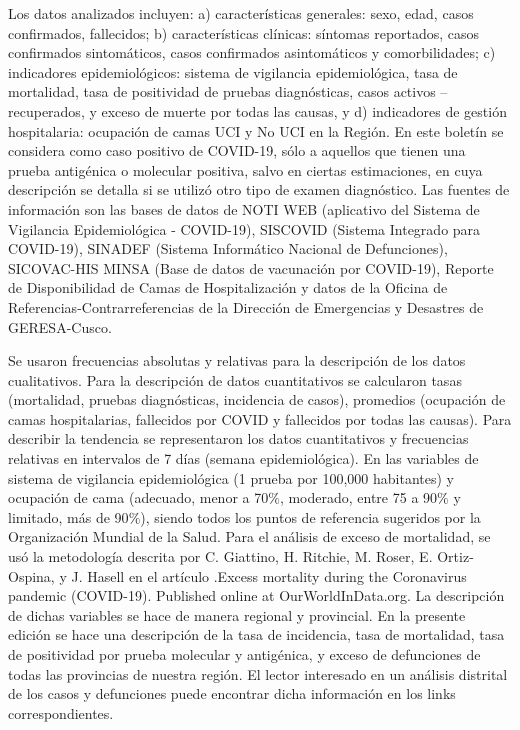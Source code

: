 \documentclass[12pt,a4paper,openany]{book}
\begin{document}
	Los datos analizados incluyen: a) características generales: sexo, edad, casos confirmados,
	fallecidos; b) características clínicas: síntomas reportados, casos confirmados sintomáticos, casos
	confirmados asintomáticos y comorbilidades; c) indicadores epidemiológicos: sistema de vigilancia
	epidemiológica, tasa de mortalidad, tasa de positividad de pruebas diagnósticas, casos activos –
	recuperados, y exceso de muerte por todas las causas, y d) indicadores de gestión hospitalaria: 
	ocupación de camas UCI y No UCI en la Región. En este boletín se considera como caso positivo de
	COVID-19, sólo a aquellos que tienen una prueba antigénica o molecular positiva, salvo en ciertas
	estimaciones, en cuya descripción se detalla si se utilizó otro tipo de examen diagnóstico.
	Las fuentes de información son las bases de datos de NOTI WEB (aplicativo del Sistema de
	Vigilancia Epidemiológica - COVID-19), SISCOVID (Sistema Integrado para COVID-19), SINADEF
	(Sistema Informático Nacional de Defunciones), SICOVAC-HIS MINSA (Base de datos de vacunación
	por COVID-19), Reporte de Disponibilidad de Camas de Hospitalización y datos de la Oficina de
	Referencias-Contrarreferencias de la Dirección de Emergencias y Desastres de GERESA-Cusco.

	Se usaron frecuencias absolutas y relativas para la descripción de los datos cualitativos. Para la
	descripción de datos cuantitativos se calcularon tasas (mortalidad, pruebas diagnósticas, incidencia de
	casos), promedios (ocupación de camas hospitalarias, fallecidos por COVID y fallecidos por todas las
	causas). Para describir la tendencia se representaron los datos cuantitativos y frecuencias relativas en
	intervalos de 7 días (semana epidemiológica). En las variables de sistema de vigilancia epidemiológica
		(1 prueba por 100,000 habitantes) y ocupación de cama (adecuado, menor a 70$\%$, moderado,
	entre 75 a 90$\%$ y limitado, más de 90$\%$), siendo todos los puntos de referencia sugeridos por la
	Organización Mundial de la Salud. Para el análisis de exceso de mortalidad, se usó la metodología
	descrita por C. Giattino, H. Ritchie, M. Roser, E. Ortiz-Ospina, y J. Hasell en el artículo .Excess
	mortality during the Coronavirus pandemic (COVID-19). Published online at OurWorldInData.org.
	La descripción de dichas variables se hace de manera regional y provincial. En la presente edición
	se hace una descripción de la tasa de incidencia, tasa de mortalidad, tasa de positividad por prueba
	molecular y antigénica, y exceso de defunciones de todas las provincias de nuestra región. El lector
	interesado en un análisis distrital de los casos y defunciones puede encontrar dicha información en
	los links correspondientes.
	
\end{document}
